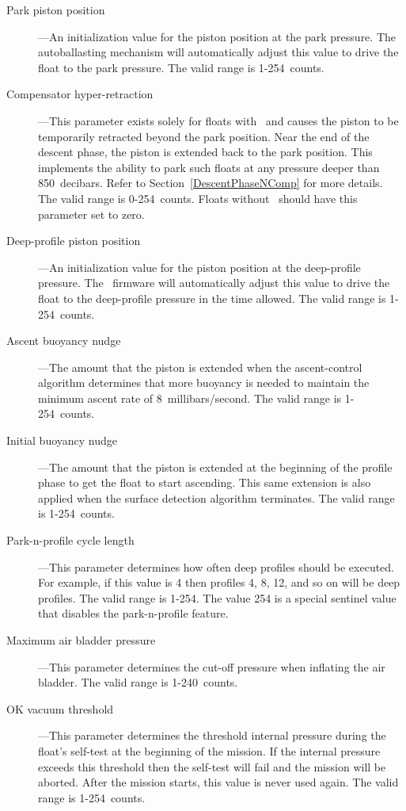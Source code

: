 \begin{description}
\item[Park piston position]---An initialization value for the piston
  position at the park pressure.  The autoballasting mechanism will
  automatically adjust this value to drive the float to the park pressure.
  The valid range is 1-254~counts.
\item[Compensator hyper-retraction]---This parameter exists solely for
  floats with \NComp\ and causes the piston to be temporarily retracted
  beyond the park position.  Near the end of the descent phase, the piston
  is extended back to the park position.  This implements the ability to
  park such floats at any pressure deeper than 850~decibars.  Refer to
  Section~\ref{DescentPhaseNComp} for more details. The valid range is
  0-254~counts.  Floats without \NComp\ should have this parameter set to
  zero.


\item[Deep-profile piston position]---An initialization value for the piston
  position at the deep-profile pressure.  The \apf\ firmware will
  automatically adjust this value to drive the float to the deep-profile
  pressure in the time allowed.  The valid range is 1-254~counts.

\item[Ascent buoyancy nudge]---The amount that the piston is extended when
  the ascent-control algorithm determines that more buoyancy is needed to
  maintain the minimum ascent rate of 8~millibars/second.  The valid range
  is 1-254~counts.

\item[Initial buoyancy nudge]---The amount that the piston is extended at
  the beginning of the profile phase to get the float to start ascending.
  This same extension is also applied when the surface detection algorithm
  terminates.  The valid range is 1-254~counts.

\item[Park-n-profile cycle length]---This parameter determines how often
  deep profiles should be executed.  For example, if this value is 4 then
  profiles 4, 8, 12, and so on will be deep profiles.  The valid range is
  1-254.  The value 254 is a special sentinel value that disables the
  park-n-profile feature.

\item[Maximum air bladder pressure]---This parameter determines the
  cut-off pressure when inflating the air bladder.   The valid range is
  1-240~counts. 

\item[OK vacuum threshold]---This parameter determines the threshold
  internal pressure during the float's self-test at the beginning of the
  mission.  If the internal pressure exceeds this threshold then the
  self-test will fail and the mission will be aborted.  After the mission
  starts, this value is never used again.  The valid range is 1-254~counts.


\end{description}
